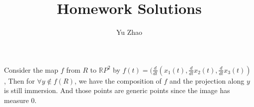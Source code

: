 \documentclass[10pt,letterpaper]{article}
\makeatletter
\newcommand{\R}{\mathbb{R}}
\newcommand\course[1]{\renewcommand\@course{#1}}
\newcommand\@course{}
\newcommand\term[1]{\renewcommand\@term{#1}}
\newcommand\@term{}
\theoremstyle{plain}
\theoremstyle{definition}
\theoremstyle{remark}
\makeatother
\begin{document}
\course{Diffrential Topology}
\term{}
\title{Homework  Solutions}
\author{Yu Zhao}
\maketitle

Consider the map $f$ from $R$ to $\R P^{2}$ by $f(t)=(\frac{d}{dt}(x_{1}(t),\frac{d}{dt}x_{2}(t),\frac{d}{dt}x_{3}(t))$ , Then for $\forall y \notin f(R)$, we have the composition of $f$ and the projection along $y$ is still immersion. And those points are generic points since the image has measure 0.
\end{document}
